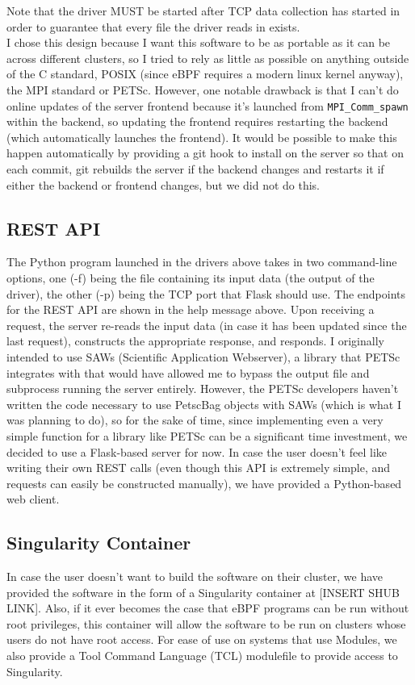 \documentclass[11pt]{article}
\begin{document}
Note that the driver MUST be started after TCP data collection has started in order to guarantee that every file the driver reads in exists.\\
I chose this design because I want this software to be as portable as it can be across different clusters, so I tried to rely as little as possible on anything outside of the C standard, POSIX (since eBPF requires a modern linux kernel anyway), the MPI standard or PETSc. However, one notable drawback is that I can't do online updates of the server frontend because it's launched from \lstinline{MPI_Comm_spawn} within the backend, so updating the frontend requires restarting the backend (which automatically launches the frontend). It would be possible to make this happen automatically by providing a git hook to install on the server so that on each commit, git rebuilds the server if the backend changes and restarts it if either the backend or frontend changes, but we did not do this.
\subsection*{REST API}
The Python program launched in the drivers above takes in two command-line options, one (-f) being the file containing its input data (the output of the driver), the other (-p) being the TCP port that Flask should use.
The endpoints for the REST API are shown in the help message above. Upon receiving a request, the server re-reads the input data (in case it has been updated since the last request), constructs the appropriate response, and responds. I originally intended to use SAWs (Scientific Application Webserver), a library that PETSc integrates with that would have allowed me to bypass the output file and subprocess running the server entirely. However, the PETSc developers haven't written the code necessary to use PetscBag objects with SAWs (which is what I was planning to do), so for the sake of time, since implementing even a very simple function for a library like PETSc can be a significant time investment, we decided to use a Flask-based server for now. In case the user doesn't feel like writing their own REST calls (even though this API is extremely simple, and requests can easily be constructed manually), we have provided a Python-based web client.
\subsection*{Singularity Container}
In case the user doesn't want to build the software on their cluster, we have provided the software in the form of a Singularity container at [INSERT SHUB LINK]. Also, if it ever becomes the case that eBPF programs can be run without root privileges, this container will allow the software to be run on clusters whose users do not have root access. For ease of use on systems that use Modules, we also provide a Tool Command Language (TCL) modulefile to provide access to Singularity.
\end{document}
